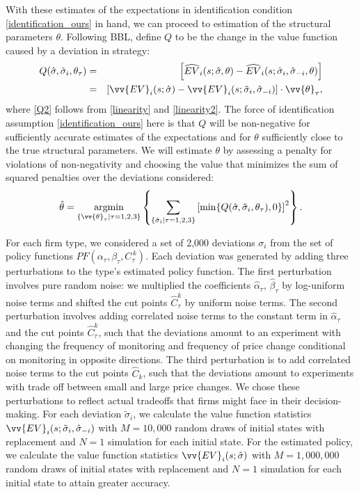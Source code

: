 \documentclass[11pt]{article}
\newcommand{\cut}[1]{C_{\tau}^{\,#1}}
\DeclareMathOperator*{\argmin}{argmin}
\begin{document}
With these estimates of the expectations in identification condition
\eqref{identification_ours} in hand, we can proceed to estimation of
the structural parameters $\theta$.  Following BBL, define $Q$ to be
the change in the value function caused by a deviation in strategy:
\begin{eqnarray}
\label{Q}
Q(\hat{\sigma}, \tilde{\sigma}_i, \theta_{\tau}) & = & \left[ \widehat{EV}_i (s;\hat{\sigma},\theta) -  \widehat{EV}_i (s;\tilde{\sigma}_i, \hat{\sigma}_{-i}, \theta ) \right] \label{Q1} \\
& = & \left[ \vv{EV}_i(s;\hat{\sigma}) - \vv{EV}_i(s; \tilde{\sigma}_i, \hat{\sigma}_{-i}) \right] \cdot \vv{\theta}_{\tau}, \label{Q2}
\end{eqnarray}
where \eqref{Q2} follows from \eqref{linearity} and
\eqref{linearity2}. The force of identification assumption
\eqref{identification_ours} here is that $Q$ will be non-negative for
sufficiently accurate estimates of the expectations and for $\theta$
sufficiently close to the true structural parameters.  We will
estimate $\theta$ by assessing a penalty for violations of
non-negativity and choosing the value that minimizes the sum of
squared penalties over the deviations considered:
\begin{equation}
\label{penalty}
\hat{\theta} = \argmin_{\{\vv{\theta}_{\tau} | \tau = 1,2,3\}} \left\{
\sum_{\{ \tilde{\sigma}_i | \tau = 1,2,3 \}} \left[ \min \{
  Q(\hat{\sigma}, \tilde{\sigma}_i, \theta_{\tau}) , 0\} \right]^2
\right\}.
\end{equation}

For each firm type, we considered a set of 2,000 deviations $\sigma_i$
from the set of policy functions
$PF(\alpha_{\tau},\beta_{\tau},\cut{k})$. Each deviation was generated
by adding three perturbations to the type's estimated policy
function. The first perturbation involves pure random noise: we
multiplied the coefficients $\hat{\alpha}_{\tau}$,
$\hat{\beta}_{\tau}$ by log-uniform noise terms and shifted the cut
points $\hat{C}^k_\tau$ by uniform noise terms. The second
perturbation involves adding correlated noise terms to the constant
term in $\hat{\alpha}_{\tau}$ and the cut points $\hat{C}^k_\tau$,
such that the deviations amount to an experiment with changing the
frequency of monitoring and frequency of price change conditional on
monitoring in opposite directions. The third perturbation is to add
correlated noise terms to the cut points $\hat{C}_k$, such that the
deviations amount to experiments with trade off between small and
large price changes.  We chose these perturbations to reflect actual
tradeoffs that firms might face in their decision-making.  For each
deviation $\tilde{\sigma}_i$, we calculate the value function
statistics $\vv{EV}_i(s; \tilde{\sigma}_i, \hat{\sigma}_{-i})$ with $M
= 10,000$ random draws of initial states with replacement and $N=1$
simulation for each initial state.  For the estimated policy, we
calculate the value function statistics $\vv{EV}_i(s;\hat{\sigma})$
with $M = 1,000,000$ random draws of initial states with replacement
and $N=1$ simulation for each initial state to attain greater
accuracy.
\end{document}
